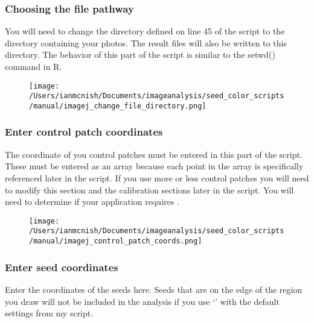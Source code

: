 \documentclass[12pt]{article}
\begin{document}
\subsubsection{Choosing the file pathway}\label{sec:pathway}

\noindent You will need to change the directory defined on line 45 of the script to the directory containing your photos. The result files will also be written to this directory. The behavior of this part of the script is similar to the setwd() command in R.\\

\begin{figure}[H]
	\centering
	\texttt{[image: /Users/ianmcnish/Documents/imageanalysis/seed\_color\_scripts/manual/imagej\_change\_file\_directory.png]}
	\label{fig:imagej_change_file_directory}
\end{figure}

\subsubsection{Enter control patch coordinates}\label{sec:control_patch_coords}

\noindent The coordinate of you control patches must be entered in this part of the script. These must be entered as an array because each point in the array is specifically referenced later in the script. If you use more or less control patches you will need to modify this section and the calibration sections later in the script. You will need to determine if your application requires .\\

\begin{figure}[H]
	\centering
	\texttt{[image: /Users/ianmcnish/Documents/imageanalysis/seed\_color\_scripts/manual/imagej\_control\_patch\_coords.png]}
	\label{fig:imagej_control_patch_coords}
\end{figure}

\subsubsection{Enter seed coordinates}\label{sec:seed_coords}

\noindent Enter the coordinates of the seeds here. Seeds that are on the edge of the region you draw will not be included in the analysis if you use `' with the default settings from my script.\\
\end{document}
